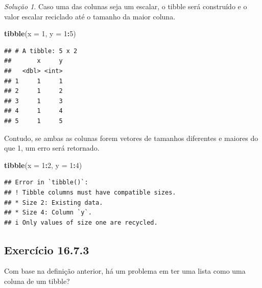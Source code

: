 \documentclass[
]{latex/krantz}
\newenvironment{Shaded}{\begin{snugshade}}{\end{snugshade}}
\newcommand{\AttributeTok}[1]{\textcolor[rgb]{0.13,0.29,0.53}{#1}}
\newcommand{\DecValTok}[1]{\textcolor[rgb]{0.00,0.00,0.81}{#1}}
\newcommand{\FunctionTok}[1]{\textcolor[rgb]{0.13,0.29,0.53}{\textbf{#1}}}
\newcommand{\NormalTok}[1]{#1}
\newcommand{\SpecialCharTok}[1]{\textcolor[rgb]{0.81,0.36,0.00}{\textbf{#1}}}
\theoremstyle{definition}
\theoremstyle{definition}
\theoremstyle{definition}
\theoremstyle{definition}
\theoremstyle{remark}
\newtheorem*{solution}{Solução}
\begin{document}
\begin{solution}

Caso uma das colunas seja um escalar, o tibble será construído e o valor escalar reciclado até o tamanho da maior coluna.

\begin{Shaded}
\begin{Highlighting}[]
\FunctionTok{tibble}\NormalTok{(}\AttributeTok{x =} \DecValTok{1}\NormalTok{, }\AttributeTok{y =} \DecValTok{1}\SpecialCharTok{:}\DecValTok{5}\NormalTok{)}
\end{Highlighting}
\end{Shaded}

\begin{verbatim}
## # A tibble: 5 x 2
##       x     y
##   <dbl> <int>
## 1     1     1
## 2     1     2
## 3     1     3
## 4     1     4
## 5     1     5
\end{verbatim}

Contudo, se ambas as colunas forem vetores de tamanhos diferentes e maiores do que 1, um erro será retornado.

\begin{Shaded}
\begin{Highlighting}[]
\FunctionTok{tibble}\NormalTok{(}\AttributeTok{x =} \DecValTok{1}\SpecialCharTok{:}\DecValTok{2}\NormalTok{, }\AttributeTok{y =} \DecValTok{1}\SpecialCharTok{:}\DecValTok{4}\NormalTok{)}
\end{Highlighting}
\end{Shaded}

\begin{verbatim}
## Error in `tibble()`:
## ! Tibble columns must have compatible sizes.
## * Size 2: Existing data.
## * Size 4: Column `y`.
## i Only values of size one are recycled.
\end{verbatim}

\end{solution}

\hypertarget{exr16-7-3}{%
\subsection*{Exercício 16.7.3}\label{exr16-7-3}}

Com base na definição anterior, há um problema em ter uma lista como uma coluna de um tibble?
\end{document}
